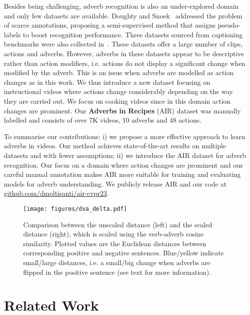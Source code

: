 \documentclass[10pt,twocolumn,letterpaper]{article}
\begin{document}
Besides being challenging, adverb recognition is also an under-explored domain and only few datasets are available.
Doughty and Snoek~\cite{doughty2022you} addressed the problem of scarce annotations, proposing a semi-supervised method that assigns pseudo-labels 
to boost recognition performance.  
Three datasets sourced from captioning benchmarks were also collected in~\cite{doughty2022you}. 
These datasets offer a large number of clips, actions and adverbs. However, 
adverbs in these datasets appear to be 
descriptive rather than action modifiers, i.e. actions do not display a significant change when modified by the adverb. 
This is an issue when adverbs are modelled as action changes as in this work. 
We thus introduce a new dataset focusing on instructional videos where actions change considerably depending on the way they are carried out. We focus on cooking videos since in this domain action changes are prominent. Our \textbf{Adverbs in Recipes} (AIR) dataset was manually labelled and consists of over 7K videos, 10 adverbs and 48 actions. 

To summarise our contributions: i) we propose a more effective approach to learn adverbs in videos. Our method achieves state-of-the-art results on multiple datasets and with fewer assumptions; ii) we introduce the AIR dataset for adverb recognition. 
Our focus on a domain where action changes are prominent and our careful manual annotation makes AIR more suitable for training and evaluating models for adverb understanding. We publicly release AIR and our code at \href{https://github.com/dmoltisanti/air-cvpr23}{github.com/dmoltisanti/air-cvpr23}.

\begin{figure*}
    \centering
    \texttt{[image: figures/dva\_delta.pdf]}
    \caption{Comparison between the unscaled distance  (left) and the scaled distance  (right), which is scaled using the verb-adverb cosine similarity. Plotted values are the Euclidean distances between corresponding positive and negative sentences. Blue/yellow indicate small/large distances, i.e. a small/big change when adverbs are flipped in the positive sentence (see text for more information). 
    }
    \label{fig:dva}
    \vspace{-5pt}
\end{figure*}

\vspace{-7pt}
\section{Related Work}
\label{sec:related_work}
\end{document}
